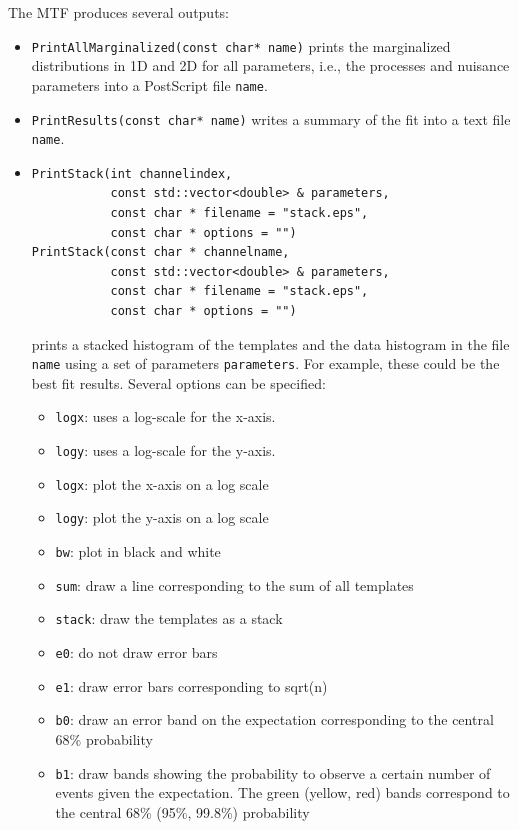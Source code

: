 \documentclass[11pt, a4paper]{article}
\begin{document}
The MTF produces several outputs:
%
\begin{itemize}
\item \verb|PrintAllMarginalized(const char* name)| prints the
  marginalized distributions in 1D and 2D for all parameters, i.e.,
  the processes and nuisance parameters into a PostScript file
  \verb|name|.
\item \verb|PrintResults(const char* name)| writes a summary of the
  fit into a text file \verb|name|.
\item
\begin{verbatim}
PrintStack(int channelindex,
           const std::vector<double> & parameters,
           const char * filename = "stack.eps",
           const char * options = "")
PrintStack(const char * channelname,
           const std::vector<double> & parameters,
           const char * filename = "stack.eps",
           const char * options = "")
\end{verbatim}
  prints a stacked histogram of the templates and the data histogram
  in the file \verb|name| using a set of parameters
  \verb|parameters|. For example, these could be the best fit
  results. Several options can be specified:
  \begin{itemize}
    \item \verb|logx|: uses a log-scale for the x-axis.
    \item \verb|logy|: uses a log-scale for the y-axis.
    \item \verb|logx|: plot the x-axis on a log scale
    \item \verb|logy|: plot the y-axis on a log scale
    \item \verb|bw|: plot in black and white
    \item \verb|sum|: draw a line corresponding to the sum of all templates
    \item \verb|stack|: draw the templates as a stack
    \item \verb|e0|: do not draw error bars
    \item \verb|e1|: draw error bars corresponding to sqrt(n)
    \item \verb|b0|: draw an error band on the expectation corresponding to the central 68\% probability
    \item \verb|b1|: draw bands showing the probability to observe a certain number of events given the expectation. The green (yellow, red) bands correspond to the central 68\% (95\%, 99.8\%) probability
  \end{itemize}
\end{itemize}
\end{document}
